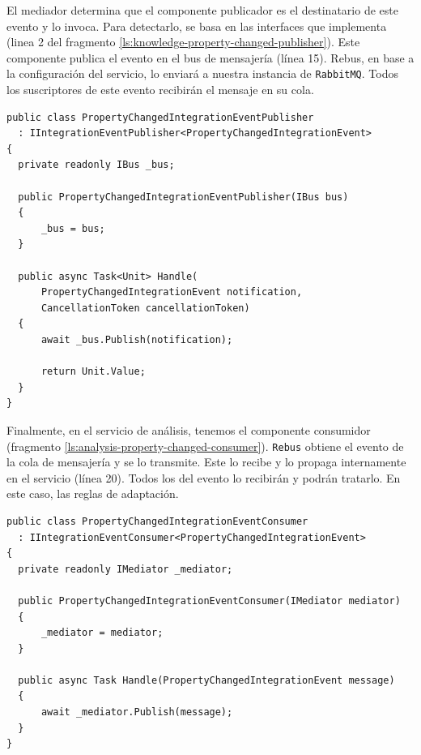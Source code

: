 
El mediador determina que el componente publicador es el destinatario de este evento y lo invoca. Para detectarlo, se basa en las interfaces que implementa (linea 2 del fragmento \ref{ls:knowledge-property-changed-publisher}). Este componente publica el evento en el bus de mensajería (línea 15). Rebus, en base a la configuración del servicio, lo enviará a nuestra instancia de \texttt{RabbitMQ}. Todos los suscriptores de este evento recibirán el mensaje en su cola.

\begin{lstlisting}[caption={El publicador de eventos captura el evento de integración y lo publica en el bus.\protect\footnotemark},captionpos=b, label=ls:knowledge-property-changed-publisher]
public class PropertyChangedIntegrationEventPublisher
  : IIntegrationEventPublisher<PropertyChangedIntegrationEvent>
{
  private readonly IBus _bus;

  public PropertyChangedIntegrationEventPublisher(IBus bus)
  {
      _bus = bus;
  }

  public async Task<Unit> Handle(
      PropertyChangedIntegrationEvent notification,
      CancellationToken cancellationToken)
  {
      await _bus.Publish(notification);

      return Unit.Value;
  }
}
\end{lstlisting}


Finalmente, en el servicio de análisis, tenemos el componente consumidor (fragmento \ref{ls:analysis-property-changed-consumer}). \texttt{Rebus} obtiene el evento de la cola de mensajería y se lo transmite. Este lo recibe y lo propaga internamente en el servicio (línea 20). Todos los  del evento lo recibirán y podrán tratarlo. En este caso, las reglas de adaptación.

\begin{lstlisting}[caption={El consumidor recibe el evento de integración del bus y lo propaga internamente. Todos los \foreign{english}{handlers} de este evento lo recibirán.\protect\footnotemark},captionpos=b, label=ls:analysis-property-changed-consumer]
public class PropertyChangedIntegrationEventConsumer
  : IIntegrationEventConsumer<PropertyChangedIntegrationEvent>
{
  private readonly IMediator _mediator;

  public PropertyChangedIntegrationEventConsumer(IMediator mediator)
  {
      _mediator = mediator;
  }

  public async Task Handle(PropertyChangedIntegrationEvent message)
  {
      await _mediator.Publish(message);
  }
}
\end{lstlisting}

